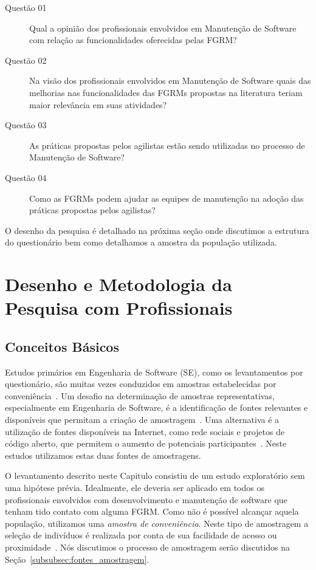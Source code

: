 \begin{description}
	\item[Questão 01] Qual a opinião dos profissionais envolvidos em Manutenção
		de Software com relação as funcionalidades oferecidas pelas
		FGRM\@?
	\item[Questão 02] Na visão dos profissionais envolvidos em Manutenção de
        Software quais das melhorias nas funcionalidades das FGRMs propostas na
        literatura teriam maior relevância em suas atividades?
	\item[Questão 03] As práticas propostas pelos agilistas estão sendo
        utilizadas no processo de Manutenção de Software?
    \item[Questão 04] Como as FGRMs podem ajudar as equipes de manutenção na
        adoção das práticas propostas pelos agilistas?
\end{description}

O desenho da pesquisa é detalhado na próxima seção onde discutimos a estrutura
do questionário bem como detalhamos a amostra da população utilizada.

\section{Desenho e Metodologia da Pesquisa com Profissionais}
\label{sec:desenho_da_pesquisa_com_profissionais}

\subsection{Conceitos Básicos}

Estudos primários em Engenharia de Software (SE), como os levantamentos por
questionário, são muitas vezes conduzidos em amostras estabelecidas por
conveniência~\cite{sjoberg2005survey, dybaa2006systematic}. Um desafio na
determinação de amostras representativas, especialmente em Engenharia de
Software, é a identificação de fontes relevantes e disponíveis que permitam a
criação de amostragem~\cite{de2014towards}. Uma alternativa é a utilização de
fontes disponíveis na Internet, como rede sociais e projetos de código aberto,
que permitem o aumento de potenciais participantes~\cite{de2013would}. Neste
estudos utilizamos estas duas fontes de amostragens.

O levantamento descrito neste Capitulo consistiu de um estudo exploratório sem
uma hipótese prévia. Idealmente, ele deveria ser aplicado em todos os
profissionais envolvidos com desenvolvimento e manutenção de software que tenham
tido contato com alguma FGRM\@. Como não é possível alcançar aquela população,
utilizamos uma \textit{amostra de conveniência}. Neste tipo de amostragem a
seleção de indivíduos é realizada por conta de sua facilidade de acesso ou
proximidade~\cite{marshall1996sampling}. Nós discutimos o processo de amostragem
serão discutidos na Seção~\ref{subsubsec:fontes_amostragem}.

